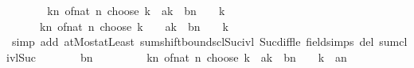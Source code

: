 \begin{isabellebody}
\ \ \isamarkupfalse%
\ \isamarkupfalse%
\ {\isachardoublequoteopen}{\isasymdots}\ {\isacharequal}{\kern0pt}\ {\isacharparenleft}{\kern0pt}{\isasymSum}k{\isasymle}n{\isachardot}{\kern0pt}\ of{\isacharunderscore}{\kern0pt}nat\ {\isacharparenleft}{\kern0pt}n\ choose\ k{\isacharparenright}{\kern0pt}\ {\isacharasterisk}{\kern0pt}\ a{\isacharcircum}{\kern0pt}k\ {\isacharasterisk}{\kern0pt}\ b{\isacharcircum}{\kern0pt}{\isacharparenleft}{\kern0pt}n\ {\isacharplus}{\kern0pt}\ {}\ {\isacharminus}{\kern0pt}\ k{\isacharparenright}{\kern0pt}{\isacharparenright}{\kern0pt}\ {\isacharplus}{\kern0pt}\isanewline
\ \ \ \ \ \ {\isacharparenleft}{\kern0pt}{\isasymSum}k{\isacharequal}{\kern0pt}{}{\isachardot}{\kern0pt}{\isachardot}{\kern0pt}n{\isacharplus}{\kern0pt}{}{\isachardot}{\kern0pt}\ of{\isacharunderscore}{\kern0pt}nat\ {\isacharparenleft}{\kern0pt}n\ choose\ {\isacharparenleft}{\kern0pt}k\ {\isacharminus}{\kern0pt}\ {}{\isacharparenright}{\kern0pt}{\isacharparenright}{\kern0pt}\ {\isacharasterisk}{\kern0pt}\ a{\isacharcircum}{\kern0pt}k\ {\isacharasterisk}{\kern0pt}\ b{\isacharcircum}{\kern0pt}{\isacharparenleft}{\kern0pt}n\ {\isacharplus}{\kern0pt}\ {}\ {\isacharminus}{\kern0pt}\ k{\isacharparenright}{\kern0pt}{\isacharparenright}{\kern0pt}{\isachardoublequoteclose}\isanewline
\ \ \ \ \isamarkupfalse%
\ {\isacharparenleft}{\kern0pt}simp\ add{\isacharcolon}{\kern0pt}\ atMost{\isacharunderscore}{\kern0pt}atLeast{}\ sum{\isachardot}{\kern0pt}shift{\isacharunderscore}{\kern0pt}bounds{\isacharunderscore}{\kern0pt}cl{\isacharunderscore}{\kern0pt}Suc{\isacharunderscore}{\kern0pt}ivl\ Suc{\isacharunderscore}{\kern0pt}diff{\isacharunderscore}{\kern0pt}le\ field{\isacharunderscore}{\kern0pt}simps\ del{\isacharcolon}{\kern0pt}\ sum{\isachardot}{\kern0pt}cl{\isacharunderscore}{\kern0pt}ivl{\isacharunderscore}{\kern0pt}Suc{\isacharparenright}{\kern0pt}\isanewline
\ \ \isamarkupfalse%
\ \isamarkupfalse%
\ {\isachardoublequoteopen}{\isasymdots}\ {\isacharequal}{\kern0pt}\ b{\isacharcircum}{\kern0pt}{\isacharparenleft}{\kern0pt}n\ {\isacharplus}{\kern0pt}\ {}{\isacharparenright}{\kern0pt}\ {\isacharplus}{\kern0pt}\isanewline
\ \ \ \ \ \ {\isacharparenleft}{\kern0pt}{\isasymSum}k{\isacharequal}{\kern0pt}{}{\isachardot}{\kern0pt}{\isachardot}{\kern0pt}n{\isachardot}{\kern0pt}\ of{\isacharunderscore}{\kern0pt}nat\ {\isacharparenleft}{\kern0pt}n\ choose\ k{\isacharparenright}{\kern0pt}\ {\isacharasterisk}{\kern0pt}\ a{\isacharcircum}{\kern0pt}k\ {\isacharasterisk}{\kern0pt}\ b{\isacharcircum}{\kern0pt}{\isacharparenleft}{\kern0pt}n\ {\isacharplus}{\kern0pt}\ {}\ {\isacharminus}{\kern0pt}\ k{\isacharparenright}{\kern0pt}{\isacharparenright}{\kern0pt}\ {\isacharplus}{\kern0pt}\ {\isacharparenleft}{\kern0pt}a{\isacharcircum}{\kern0pt}{\isacharparenleft}{\kern0pt}n\ {\isacharplus}{\kern0pt}\ {}{\isacharparenright}{\kern0pt}\ {\isacharplus}{\kern0pt}\isanewline

\end{isabellebody}
